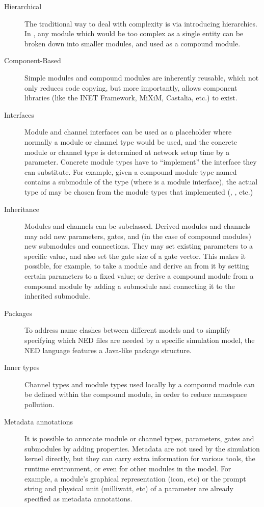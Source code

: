 \begin{description}

\item[Hierarchical] The traditional way to deal with complexity is via
introducing hierarchies. In \opp, any module which would be too complex as
a single entity can be broken down into smaller modules, and used as a
compound module.

\item[Component-Based] Simple modules and compound modules are inherently
reusable, which not only reduces code copying, but more importantly, allows
component libraries (like the INET Framework, MiXiM, Castalia, etc.) to
exist.

\item[Interfaces] Module and channel interfaces can be used as a
placeholder where normally a module or channel type would be used, and the
concrete module or channel type is determined at network setup time by a
parameter. Concrete module types have to ``implement'' the interface they
can substitute. For example, given a compound module type named
 contains a  submodule of the type
 (where  is a module interface), the actual
type of  may be chosen from the module types that implemented
 (, , etc.)

\item[Inheritance] Modules and channels can be subclassed. Derived modules
and channels may add new parameters, gates, and (in the case of compound
modules) new submodules and connections. They may set existing parameters
to a specific value, and also set the gate size of a gate vector. This
makes it possible, for example, to take a  module
and derive an  from it by setting certain parameters to a fixed
value; or derive a  compound module from a
 compound module by adding a  submodule and
connecting it to the inherited  submodule.

\item[Packages] To address name clashes between different models and to
simplify specifying which NED files are needed by a specific simulation
model, the NED language features a Java-like package structure.

\item[Inner types] Channel types and module types used locally by a
compound module can be defined within the compound module, in order to
reduce namespace pollution.

\item[Metadata annotations] It is possible to annotate module or channel
types, parameters, gates and submodules by adding properties. Metadata are
not used by the simulation kernel directly, but they can carry extra
information for various tools, the runtime environment, or even for other
modules in the model. For example, a module's graphical representation
(icon, etc)  or the prompt string and physical unit (milliwatt, etc) of a
parameter are already specified as metadata annotations.

\end{description}

